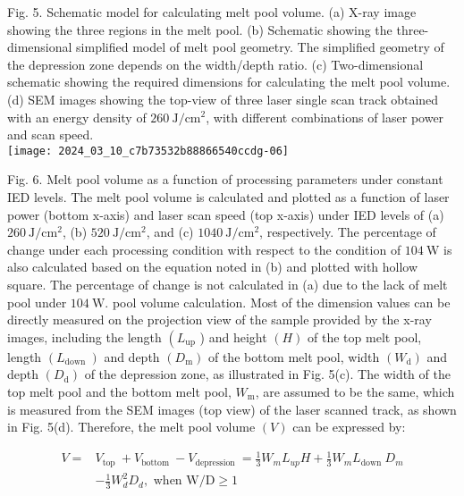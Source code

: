 \documentclass[10pt]{article}
\begin{document}
Fig. 5. Schematic model for calculating melt pool volume. (a) X-ray image showing the three regions in the melt pool. (b) Schematic showing the three-dimensional simplified model of melt pool geometry. The simplified geometry of the depression zone depends on the width/depth ratio. (c) Two-dimensional schematic showing the required dimensions for calculating the melt pool volume. (d) SEM images showing the top-view of three laser single scan track obtained with an energy density of $260 \mathrm{~J} / \mathrm{cm}^{2}$, with different combinations of laser power and scan speed.\\
\texttt{[image: 2024\_03\_10\_c7b73532b88866540ccdg-06]}

Fig. 6. Melt pool volume as a function of processing parameters under constant IED levels. The melt pool volume is calculated and plotted as a function of laser power (bottom $\mathrm{x}$-axis) and laser scan speed (top x-axis) under IED levels of (a) $260 \mathrm{~J} / \mathrm{cm}^{2}$, (b) $520 \mathrm{~J} / \mathrm{cm}^{2}$, and (c) $1040 \mathrm{~J} / \mathrm{cm}^{2}$, respectively. The percentage of change under each processing condition with respect to the condition of $104 \mathrm{~W}$ is also calculated based on the equation noted in (b) and plotted with hollow square. The percentage of change is not calculated in (a) due to the lack of melt pool under $104 \mathrm{~W}$. pool volume calculation. Most of the dimension values can be directly measured on the projection view of the sample provided by the x-ray images, including the length $\left(L_{\mathrm{up}}\right.$ ) and height $(H)$ of the top melt pool, length $\left(L_{\text {down }}\right)$ and depth $\left(D_{\mathrm{m}}\right)$ of the bottom melt pool, width $\left(W_{\mathrm{d}}\right)$ and depth $\left(D_{\mathrm{d}}\right)$ of the depression zone, as illustrated in Fig. 5(c). The width of the top melt pool and the bottom melt pool, $W_{\mathrm{m}}$, are assumed to be the same, which is measured from the SEM images (top view) of the laser scanned track, as shown in Fig. 5(d). Therefore, the melt pool volume $(V)$ can be expressed by:


\begin{align*}
V= & V_{\text {top }}+V_{\text {bottom }}-V_{\text {depression }}=\frac{1}{3} W_{m} L_{u p} H+\frac{1}{3} W_{m} L_{\text {down }} D_{m} \\
& -\frac{1}{3} W_{d}^{2} D_{d}, \text { when } \mathrm{W} / \mathrm{D} \geq 1 \tag{1}
\end{align*}
\end{document}
